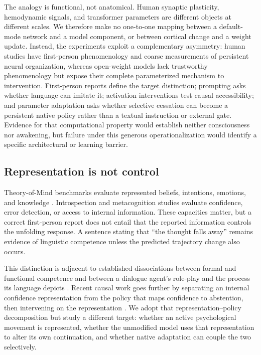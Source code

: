 \documentclass[10pt,twocolumn]{article}
\begin{document}
The analogy is functional, not anatomical. Human synaptic plasticity, hemodynamic
signals, and transformer parameters are different objects at different scales.
We therefore make no one-to-one mapping between a default-mode network and a
model component, or between cortical change and a weight update. Instead, the
experiments exploit a complementary asymmetry: human studies have first-person
phenomenology and coarse measurements of persistent neural organization, whereas
open-weight models lack trustworthy phenomenology but expose their complete
parameterized mechanism to intervention. First-person reports define the target
distinction; prompting asks whether language can imitate it; activation
interventions test causal accessibility; and parameter adaptation asks whether
selective cessation can become a persistent native policy rather than a textual
instruction or external gate. Evidence for that computational property would
establish neither consciousness nor awakening, but failure under this generous
operationalization would identify a specific architectural or learning barrier.

\subsection{Representation is not control}

Theory-of-Mind benchmarks evaluate represented beliefs, intentions, emotions,
and knowledge \citep{chen2024tom,jones2024epitome}. Introspection and
metacognition studies evaluate confidence, error detection, or access to internal
information. These capacities matter, but a correct first-person report does
not entail that the reported information controls the unfolding response. A
sentence stating that ``the thought falls away'' remains evidence of linguistic
competence unless the predicted trajectory change also occurs.

This distinction is adjacent to established dissociations between formal and
functional competence \citep{mahowald2024dissociating} and between a dialogue
agent's role-play and the process its language depicts
\citep{shanahan2023roleplay}. Recent causal work goes further by separating an
internal confidence representation from the policy that maps confidence to
abstention, then intervening on the representation
\citep{kumaran2026confidence}. We adopt that representation--policy decomposition
but study a different target: whether an active psychological movement is
represented, whether the unmodified model uses that representation to alter its
own continuation, and whether native adaptation can couple the two selectively.
\end{document}
